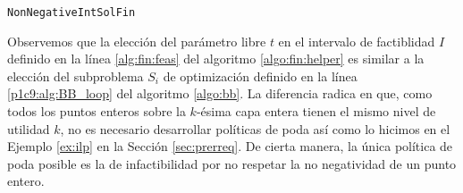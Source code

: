 \begin{algorithm}[hbtp]
	\LinesNumbered
	\caption{\texttt{NonNegativeIntSolFin}}
	\label{algo:fin:helper}
\end{algorithm}

Observemos que la elección del parámetro libre $t$ en el intervalo de factiblidad $I$ definido en la
línea \ref{alg:fin:feas} del algoritmo \ref{algo:fin:helper} es similar a la elección del
subproblema $S_i$ de optimización definido en la línea \ref{p1c9:alg:BB_loop} del algoritmo
\ref{algo:bb}. La diferencia radica en que, como todos los puntos enteros sobre la $k$-ésima capa
entera tienen el mismo nivel de utilidad $k$, no es necesario desarrollar políticas de poda así como
lo hicimos en el Ejemplo \ref{ex:ilp} en la Sección \ref{sec:prerreq}. De cierta manera, la única
política de poda posible es la de infactibilidad por no respetar la no negatividad de un punto
entero.

